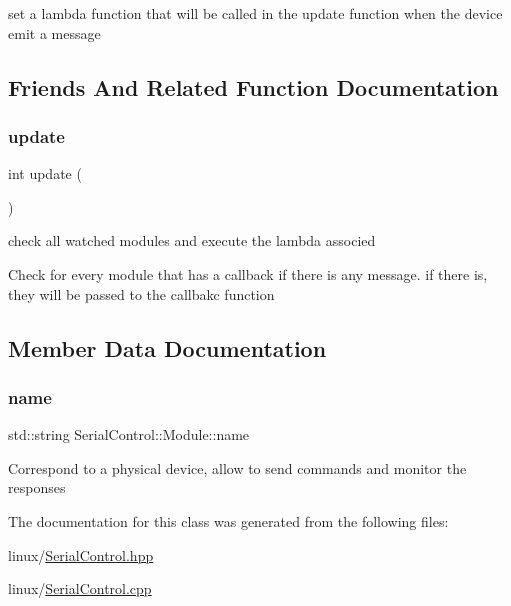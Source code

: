 set a lambda function that will be called in the update function when the device emit a message 

\subsection{Friends And Related Function Documentation}
\mbox{\label{classSerialControl_1_1Module_a49ece8cb08e27584142748fa70eea00b}} 
\subsubsection{\texorpdfstring{update}{update}}
{\footnotesize\ttfamily int update (\begin{DoxyParamCaption}{ }\end{DoxyParamCaption})\hspace{0.3cm}{\ttfamily [friend]}}

check all watched modules and execute the lambda associed

Check for every module that has a callback if there is any message. if there is, they will be passed to the callbakc function 

\subsection{Member Data Documentation}
\mbox{\label{classSerialControl_1_1Module_a7366c32df408fb367deb22bab7ee0bc5}} 
\subsubsection{\texorpdfstring{name}{name}}
{\footnotesize\ttfamily std\+::string Serial\+Control\+::\+Module\+::name}

Correspond to a physical device, allow to send commands and monitor the responses 

The documentation for this class was generated from the following files\+:\begin{DoxyCompactItemize}
\item 
linux/\mbox{\hyperlink{SerialControl_8hpp}{Serial\+Control.\+hpp}}\item 
linux/\mbox{\hyperlink{SerialControl_8cpp}{Serial\+Control.\+cpp}}\end{DoxyCompactItemize}
